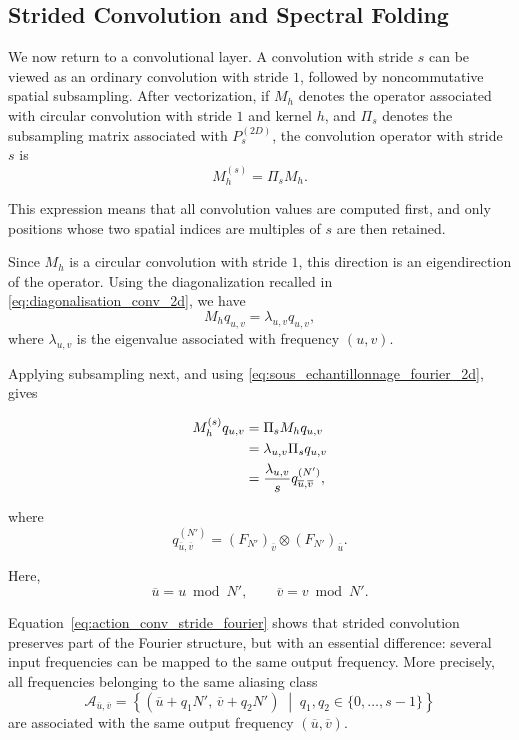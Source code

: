 \subsection{Strided Convolution and Spectral Folding}

We now return to a convolutional layer. A convolution with stride $s$ can be viewed
as an ordinary convolution with stride $1$, followed by noncommutative spatial subsampling. After vectorization,
if $M_h$ denotes the operator associated with circular convolution with stride $1$ and kernel $h$, and
$\Pi_s$ denotes the subsampling matrix associated with $P_s^{(2D)}$, the convolution operator
with stride $s$ is
\begin{equation}
    M_h^{(s)}
    =
    \Pi_s M_h.
    \label{eq:conv_stride_sampling}
\end{equation}

This expression means that all convolution values are computed first, and only
positions whose two spatial indices are multiples of $s$ are then retained.

Since $M_h$ is a circular convolution with stride $1$, this direction is an eigendirection of
the operator. Using the diagonalization recalled in \eqref{eq:diagonalisation_conv_2d}, we have
\[
    M_h q_{u,v}
    =
    \lambda_{u,v} q_{u,v},
\]
where $\lambda_{u,v}$ is the eigenvalue associated with frequency $(u,v)$.

Applying subsampling next, and using
\eqref{eq:sous_echantillonnage_fourier_2d}, gives

\begin{align}
    M_h^{(s)} q_{u,v}
    &=
    \Pi_s M_h q_{u,v} \notag \\
    &=
    \lambda_{u,v}\Pi_s q_{u,v} \notag \\
    &=
    \frac{\lambda_{u,v}}{s}
    q_{\overline{u},\overline{v}}^{(N')},
    \label{eq:action_conv_stride_fourier}
\end{align}

where
\[
    q_{\overline{u},\overline{v}}^{(N')}
    =
    (F_{N'})_{\overline{v}} \otimes (F_{N'})_{\overline{u}}.
\]

Here,
\[
    \overline{u}=u \bmod N',
    \qquad
    \overline{v}=v \bmod N'.
\]

Equation~\eqref{eq:action_conv_stride_fourier} shows that strided convolution preserves part
of the Fourier structure, but with an essential difference: several input frequencies can be
mapped to the same output frequency. More precisely, all frequencies belonging to the same
aliasing class
\[
    \mathcal{A}_{\overline{u},\overline{v}}
    =
    \left\{
        (\overline{u}+q_1N',\,\overline{v}+q_2N')
        \;\middle|\;
        q_1,q_2\in\{0,\dots,s-1\}
    \right\}
\]
are associated with the same output frequency $(\overline{u},\overline{v})$.

